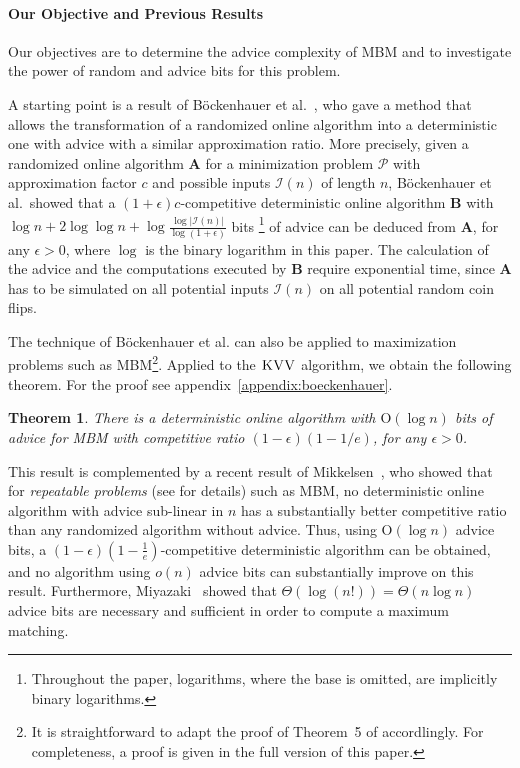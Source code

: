 \documentclass[a4paper]{article}
\newcommand{\Order}{\mathrm{O}}
\newtheorem{theorem}{Theorem}
\begin{document}
\paragraph*{Our Objective and Previous Results} Our objectives are to determine the advice complexity
of \textsc{MBM} and to investigate the power of random and advice bits for this problem.

A starting point is a result of B\"{o}ckenhauer et al.~\cite{bkkk11}, who gave a method that allows the
transformation of a randomized online algorithm into a deterministic one with advice with a similar
approximation ratio. More precisely, given a randomized online algorithm \textbf{A} for a minimization problem
$\mathcal{P}$ with approximation factor $c$ and possible inputs $\mathcal{I}(n)$ of length $n$,
B\"{o}ckenhauer et al.\ showed that a $(1+\epsilon)c$-competitive deterministic online algorithm \textbf{B}
with $\log n + 2 \log \log n + \log \frac{\log |\mathcal{I}(n)|}{\log (1+\epsilon)}$
bits
\footnote{Throughout the paper, logarithms, where the base is omitted, are implicitly binary logarithms.}
of advice can be deduced from \textbf{A}, for any $\epsilon > 0$,
where $\log$ is the binary logarithm in this paper.
The calculation of the advice and the computations executed by \textbf{B} require exponential time, since
\textbf{A} has to be simulated on all potential inputs $\mathcal{I}(n)$ on all potential
random coin flips.

The technique of Böckenhauer et al. \cite{bkkk11} can also be applied to maximization problems such as \textsc{MBM}\footnote{It is
straightforward to adapt the proof of Theorem~5 of \cite{bkkk11} accordlingly. For completeness, a proof is given in the full
version of this paper.}.
Applied to the $\textsc{KVV}$ algorithm, we obtain the following theorem.  For the proof see appendix~\ref{appendix:boeckenhauer}.

\begin{theorem} \label{thm:bockenhauer}
 There is a deterministic online algorithm with $\Order(\log n)$ bits
 of advice for \textsc{MBM} with competitive ratio $(1-\epsilon) (1-1/e)$, for any $\epsilon > 0$.
\end{theorem}

This result is complemented by a recent result of Mikkelsen~\cite{m15}, who showed that
for {\em repeatable problems} (see \cite{m15} for details) such as \textsc{MBM},
no deterministic online algorithm with advice sub-linear in $n$
has a substantially better competitive ratio than any randomized algorithm without advice.
Thus, using
$\Order(\log n)$ advice bits, a $(1-\epsilon)(1-\frac{1}{e})$-competitive deterministic algorithm can be obtained,
and no algorithm using $o(n)$ advice bits can substantially improve on this result. Furthermore,
Miyazaki~\cite{m14} showed that $\Theta(\log(n!)) = \Theta(n \log n)$ advice bits are necessary
and sufficient in order to compute a maximum matching.
\end{document}
